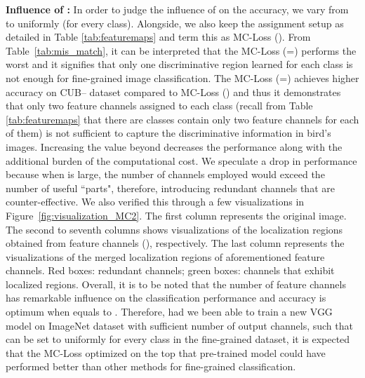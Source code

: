 \documentclass[journal]{IEEEtran}
\begin{document}
\noindent \textbf{Influence of :}  In order to judge the influence of  on the accuracy, we vary  from  to  uniformly (for every class). Alongside, we also keep the  assignment setup as detailed in Table \ref{tab:featuremaps} and term this as MC-Loss (). From Table~\ref{tab:mis_match}, it can be interpreted that the MC-Loss (=) performs the worst and it signifies that only one discriminative region learned for each class is not enough for fine-grained image classification. The MC-Loss (=) achieves  higher accuracy on CUB-- dataset compared to  MC-Loss () and thus it demonstrates that only two feature channels assigned to each class (recall from Table \ref{tab:featuremaps} that there are  classes contain only two feature channels for each of them) is not sufficient to capture the discriminative information in bird's images. Increasing the  value beyond  decreases the performance along with the additional burden of the computational cost.
We speculate a drop in performance because when  is large, the number of channels employed would exceed the number of useful ``parts", therefore, introducing redundant channels that are counter-effective. We also verified this through a few visualizations in Figure~\ref{fig:visualization_MC2}. The first column represents the original image. The second to seventh columns shows visualizations of the localization regions obtained from  feature channels (), respectively. The last column represents the visualizations of the merged localization regions of  aforementioned feature channels. Red boxes: redundant channels; green boxes: channels that exhibit localized regions. Overall, it is to be noted that the number of feature channels has remarkable influence on the classification performance and accuracy is optimum when  equals to . Therefore, had we been able to train a new VGG model on ImageNet dataset with sufficient number of output channels, such that  can be set to  uniformly for every class in the fine-grained dataset, it is expected that the MC-Loss optimized on the top that pre-trained model could have performed better than other methods for fine-grained classification.  
\end{document}
